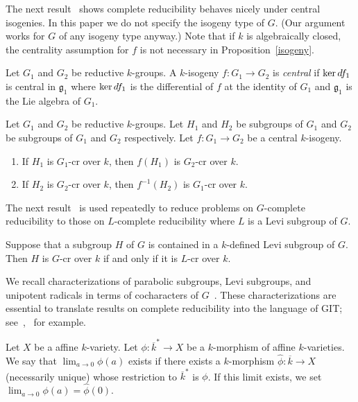 The next result~\cite[Prop.~1.12]{Uchiyama-Nonperfect-pre} shows complete reducibility behaves nicely under central isogenies. In this paper we do not specify the isogeny type of $G$. (Our argument works for $G$ of any isogeny type anyway.) Note that if $k$ is algebraically closed, the centrality assumption for $f$ is not necessary in Proposition~\ref{isogeny}. 
\begin{defn}
Let $G_1$ and $G_2$ be reductive $k$-groups. A $k$-isogeny $f:G_1\rightarrow G_2$ is \emph{central} if $\textup{ker}\,df_1$ is central in $\mathfrak{g_1}$ where $\textup{ker}\,df_1$ is the differential of $f$ at the identity of $G_1$ and $\mathfrak{g_1}$ is the Lie algebra of $G_1$. 
\end{defn}
\begin{prop}\label{isogeny}
Let $G_1$ and $G_2$ be reductive $k$-groups. Let $H_1$ and $H_2$ be subgroups of $G_1$ and $G_2$ be subgroups of $G_1$ and $G_2$ respectively. Let $f:G_1 \rightarrow G_2$ be a central $k$-isogeny. 
\begin{enumerate}
\item{If $H_1$ is $G_1$-cr over $k$, then $f(H_1)$ is $G_2$-cr over $k$.}
\item{If $H_2$ is $G_2$-cr over $k$, then $f^{-1}(H_2)$ is $G_1$-cr over $k$.} 
\end{enumerate}
\end{prop}


The next result~\cite[Thm.~1.4]{Bate-cocharacterbuildings-Arx} is used repeatedly to reduce problems on $G$-complete reducibility to those on $L$-complete reducibility where $L$ is a Levi subgroup of $G$. 

\begin{prop}\label{G-cr-L-cr}
Suppose that a subgroup $H$ of $G$ is contained in a $k$-defined Levi subgroup of $G$. Then $H$ is $G$-cr over $k$ if and only if it is $L$-cr over $k$. 
\end{prop}


We recall characterizations of parabolic subgroups, Levi subgroups, and unipotent radicals in terms of cocharacters of $G$~\cite[Prop.~8.4.5]{Springer-book}. These characterizations are essential to translate results on complete reducibility into the language of GIT; see~\cite{Bate-geometric-Inventione},~\cite{Bate-uniform-TransAMS} for example. 

\begin{defn}
Let $X$ be a affine $k$-variety. Let $\phi : \overline k^*\rightarrow X$ be a $k$-morphism of affine $k$-varieties. We say that $\displaystyle\lim_{a\rightarrow 0}\phi(a)$ exists if there exists a $k$-morphism $\hat\phi:\overline k\rightarrow X$ (necessarily unique) whose restriction to $\overline k^{*}$ is $\phi$. If this limit exists, we set $\displaystyle\lim_{a\rightarrow 0}\phi(a) = \hat\phi(0)$.
\end{defn}

